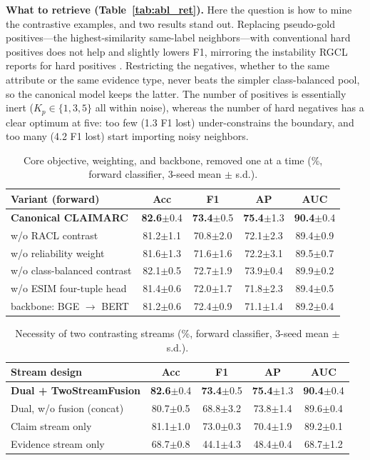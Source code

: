 \documentclass[letterpaper]{article}
\newcommand{\best}[1]{\textbf{#1}}
\newcommand{\std}[1]{{\scriptsize$\pm$#1}}
\begin{document}
\textbf{What to retrieve (Table~\ref{tab:abl_ret}).} Here the question is how to mine the contrastive examples, and two results stand out. Replacing pseudo-gold positives---the highest-similarity same-label neighbors---with conventional hard positives does not help and slightly lowers F1, mirroring the instability RGCL reports for hard positives \citep{mei2024rgcl}. Restricting the negatives, whether to the same attribute or the same evidence type, never beats the simpler class-balanced pool, so the canonical model keeps the latter. The number of positives is essentially inert ($K_p\in\{1,3,5\}$ all within noise), whereas the number of hard negatives has a clear optimum at five: too few (1.3 F1 lost) under-constrains the boundary, and too many (4.2 F1 lost) start importing noisy neighbors.

\begin{table}[t]
\centering\small
\setlength{\tabcolsep}{5pt}
\begin{tabular}{lcccc}
\toprule
Variant (forward) & Acc & F1 & AP & AUC \\
\midrule
\textbf{Canonical CLAIMARC} & \best{82.6}\std{0.4} & \best{73.4}\std{0.5} & \best{75.4}\std{1.3} & \best{90.4}\std{0.4} \\
w/o RACL contrast & 81.2\std{1.1} & 70.8\std{2.0} & 72.1\std{2.3} & 89.4\std{0.9} \\
w/o reliability weight & 81.6\std{1.3} & 71.6\std{1.6} & 72.2\std{3.1} & 89.5\std{0.7} \\
w/o class-balanced contrast & 82.1\std{0.5} & 72.7\std{1.9} & 73.9\std{0.4} & 89.9\std{0.2} \\
w/o ESIM four-tuple head & 81.4\std{0.6} & 72.0\std{1.7} & 71.8\std{2.3} & 89.4\std{0.5} \\
backbone: BGE $\to$ BERT & 81.2\std{0.6} & 72.4\std{0.9} & 71.1\std{1.4} & 89.2\std{0.4} \\
\bottomrule
\end{tabular}
\caption{Core objective, weighting, and backbone, removed one at a time (\%, forward classifier, 3-seed mean $\pm$ s.d.).}
\label{tab:abl_core}
\end{table}

\begin{table}[t]
\centering\small
\setlength{\tabcolsep}{5pt}
\begin{tabular}{lcccc}
\toprule
Stream design & Acc & F1 & AP & AUC \\
\midrule
\textbf{Dual + TwoStreamFusion} & \best{82.6}\std{0.4} & \best{73.4}\std{0.5} & \best{75.4}\std{1.3} & \best{90.4}\std{0.4} \\
Dual, w/o fusion (concat) & 80.7\std{0.5} & 68.8\std{3.2} & 73.8\std{1.4} & 89.6\std{0.4} \\
Claim stream only & 81.1\std{1.0} & 73.0\std{0.3} & 70.4\std{1.9} & 89.2\std{0.1} \\
Evidence stream only & 68.7\std{0.8} & 44.1\std{4.3} & 48.4\std{0.4} & 68.7\std{1.2} \\
\bottomrule
\end{tabular}
\caption{Necessity of two contrasting streams (\%, forward classifier, 3-seed mean $\pm$ s.d.).}
\label{tab:abl_stream}
\end{table}
\end{document}
